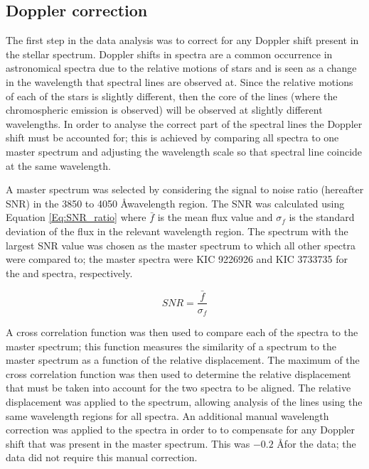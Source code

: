 \subsection{Doppler correction}
\label{Chp4_data_analysis_doppler}
The first step in the data analysis was to correct for any Doppler shift present in the stellar spectrum. Doppler shifts in spectra are a common occurrence in astronomical spectra due to the relative motions of stars and is seen as a change in the wavelength that spectral lines are observed at. Since the relative motions of each of the stars is slightly different, then the core of the \caII lines (where the chromospheric emission is observed) will be observed at slightly different wavelengths. In order to analyse the correct part of the spectral lines the Doppler shift must be accounted for; this is achieved by comparing all spectra to one master spectrum and adjusting the wavelength scale so that spectral line coincide at the same wavelength.

A master spectrum was selected by considering the signal to noise ratio (hereafter SNR) in the 3850 to 4050 \AA \space wavelength region. The SNR was calculated using Equation \ref{Eq:SNR_ratio} where $\bar{f}$ is the mean flux value and $\sigma_{f}$ is the standard deviation of the flux in the relevant wavelength region. The spectrum with the largest SNR value was chosen as the master spectrum to which all other spectra were compared to; the master spectra were KIC 9226926 and KIC 3733735 for the \narval and \esp spectra, respectively.

\begin{equation}
SNR = \frac{\bar{f}}{\sigma_{f}}
\label{Eq:SNR_ratio}
\end{equation}

A cross correlation function was then used to compare each of the spectra to the master spectrum; this function measures the similarity of a spectrum to the master spectrum as a function of the relative displacement. The maximum of the cross correlation function was then used to determine the relative displacement that must be taken into account for the two spectra to be aligned. The relative displacement was applied to the spectrum, allowing analysis of the \caII lines using the same wavelength regions for all spectra. An additional manual wavelength correction was applied to the spectra in order to to compensate for any Doppler shift that was present in the master spectrum. This was $-0.2$ \space \AA for the \esp data; the \narval data did not require this manual correction.

